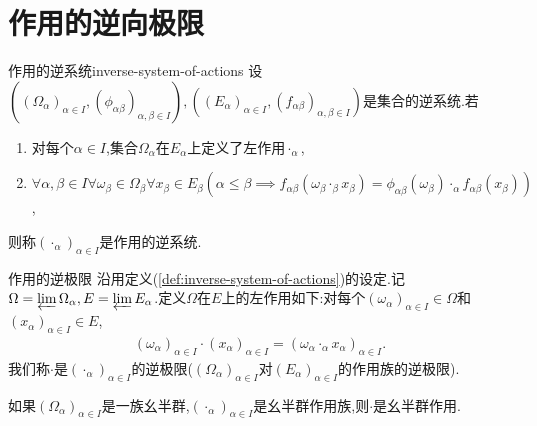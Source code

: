 \section{作用的逆向极限}

\begin{definition}{作用的逆系统}{inverse-system-of-actions}
	设$\left(\left(\Omega_{\alpha}\right)_{\alpha\in I},\left(\phi_{\alpha\beta}\right)_{\alpha,\beta\in I}\right),\left(\left(E_{\alpha}\right)_{\alpha\in I},\left(f_{\alpha\beta}\right)_{\alpha,\beta\in I}\right)$是集合的逆系统.若
	\begin{enumerate}
		\item 对每个$\alpha\in I$,集合$\Omega_{\alpha}$在$E_{\alpha}$上定义了左作用$\cdot_{\alpha}$,
		\item $\forall\alpha,\beta\in I\forall \omega_{\beta}\in\Omega_{\beta}\forall x_{\beta}\in E_{\beta}\left(\alpha\leq\beta\implies f_{\alpha\beta}\left(\omega_{\beta}\cdot_{\beta}x_{\beta}\right)=\phi_{\alpha\beta}\left(\omega_{\beta}\right)\cdot_{\alpha}f_{\alpha\beta}\left(x_{\beta}\right)\right)$,
	\end{enumerate}
	则称$\left(\cdot_{\alpha}\right)_{\alpha\in I}$是作用的逆系统.
\end{definition}

\begin{definition}{作用的逆极限}{}
	沿用定义(\cref{def:inverse-system-of-actions})的设定.记$\Omega=\varprojlim\Omega_{\alpha},E=\varprojlim E_{\alpha}$.定义$\Omega$在$E$上的左作用如下:对每个$\left(\omega_{\alpha}\right)_{\alpha\in I}\in\Omega$和$\left(x_{\alpha}\right)_{\alpha\in I}\in E$,
	\begin{align*}
		\left(\omega_{\alpha}\right)_{\alpha\in I}\cdot\left(x_{\alpha}\right)_{\alpha\in I}=\left(\omega_{\alpha}\cdot_{\alpha}x_{\alpha}\right)_{\alpha\in I}.
	\end{align*}
	我们称$\cdot$是$\left(\cdot_{\alpha}\right)_{\alpha\in I}$的逆极限($\left(\Omega_{\alpha}\right)_{\alpha\in I}$对$\left(E_{\alpha}\right)_{\alpha\in I}$的作用族的逆极限).
\end{definition}

\begin{remark}{}{}
	如果$\left(\Omega_{\alpha}\right)_{\alpha\in I}$是一族幺半群,$\left(\cdot_{\alpha}\right)_{\alpha\in I}$是幺半群作用族,则$\cdot$是幺半群作用.
\end{remark}

